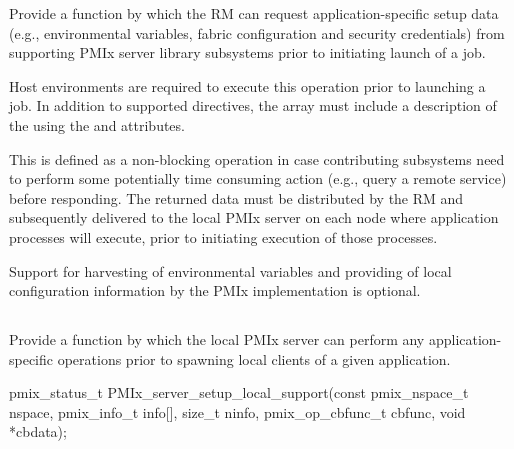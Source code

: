 \optattrend

\descr

Provide a function by which the \ac{RM} can request application-specific setup data (e.g., environmental variables, fabric configuration and security credentials) from supporting \ac{PMIx} server library subsystems prior to initiating launch of a job.

\advicermstart
Host environments are required to execute this operation prior to launching a job. In addition to supported directives, the  array must include a description of the  using the  and  attributes.
\advicermend

This is defined as a non-blocking operation in case contributing subsystems need to perform some potentially time consuming action (e.g., query a remote service) before responding. The returned data must be distributed by the \ac{RM} and subsequently delivered to the local \ac{PMIx} server on each node where application processes will execute, prior to initiating execution of those processes.

\adviceimplstart
Support for harvesting of environmental variables and providing of local configuration information by the \ac{PMIx} implementation is optional.
\adviceimplend

\subsection{}

\summary

Provide a function by which the local \ac{PMIx} server can perform any application-specific operations prior to spawning local clients of a given application.

\format

\cspecificstart
\begin{codepar}
pmix_status_t
PMIx_server_setup_local_support(const pmix_nspace_t nspace,
                                pmix_info_t info[], size_t ninfo,
                                pmix_op_cbfunc_t cbfunc,
                                void *cbdata);
\end{codepar}
\cspecificend

\begin{arglist}
\end{arglist}

